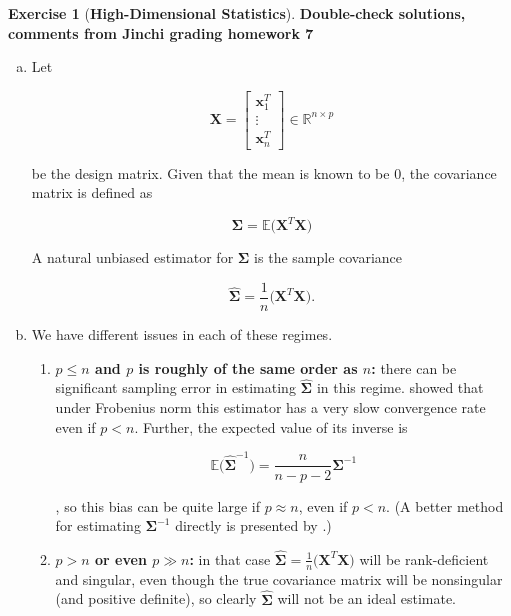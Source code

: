 \documentclass{article}
\theoremstyle{definition}
\newtheorem{exercise}{Exercise}
\theoremstyle{definition}
\theoremstyle{definition}
\theoremstyle{definition}
\newcommand{\E}{\mathbb{E}}
\begin{document}
\begin{exercise}[\textbf{High-Dimensional Statistics}] \textbf{Double-check solutions, comments from Jinchi grading homework 7}

\begin{enumerate}[(a)]

\item Let 

\[
\boldsymbol{X} = \begin{bmatrix} \boldsymbol{x}_1^T \\ \vdots \\  \boldsymbol{x}_n^T   \end{bmatrix} \in \mathbb{R}^{n \times p}
\]

be the design matrix. Given that the mean is known to be 0, the covariance matrix is defined as 

\[
\boldsymbol{\Sigma} = \E \big(  \boldsymbol{X}^T \boldsymbol{X} \big)
\]

A natural unbiased estimator for \(\boldsymbol{\Sigma}\) is the sample covariance

\[
\widehat{\boldsymbol{\Sigma}} = \frac{1}{n} \big(\boldsymbol{X}^T \boldsymbol{X} \big).
\]

\item We have different issues in each of these regimes.

\begin{enumerate}[(1)]

\item \textbf{\(p \leq n\) and \(p\) is roughly of the same order as \(n\):} there can be significant sampling error in estimating \(\widehat{\boldsymbol{\Sigma}}\) in this regime. \citet{Fan2008} showed that under Frobenius norm this estimator has a very slow convergence rate even if \(p < n\). Further, the expected value of its inverse is

\[
\E  \big(\widehat{\boldsymbol{\Sigma}}^{-1}\big) = \frac{n}{n-p-2}  \boldsymbol{\Sigma}^{-1}
\] 

\citep{Bai2011}, so this bias can be quite large if \(p \approx n\), even if \(p < n\). (A better method for estimating \( \boldsymbol{\Sigma}^{-1}\) directly is presented by \citet{Fan2008}.)

\item \textbf{\(p > n\) or even \(p \gg n\):} in that case \(\widehat{\boldsymbol{\Sigma}} = \frac{1}{n} \big(\boldsymbol{X}^T \boldsymbol{X} \big)\) will be rank-deficient and singular, even though the true covariance matrix will be nonsingular (and positive definite), so clearly \(\widehat{\boldsymbol{\Sigma}}\) will not be an ideal estimate. 


\end{enumerate}
\end{enumerate}
\end{exercise}
\end{document}
